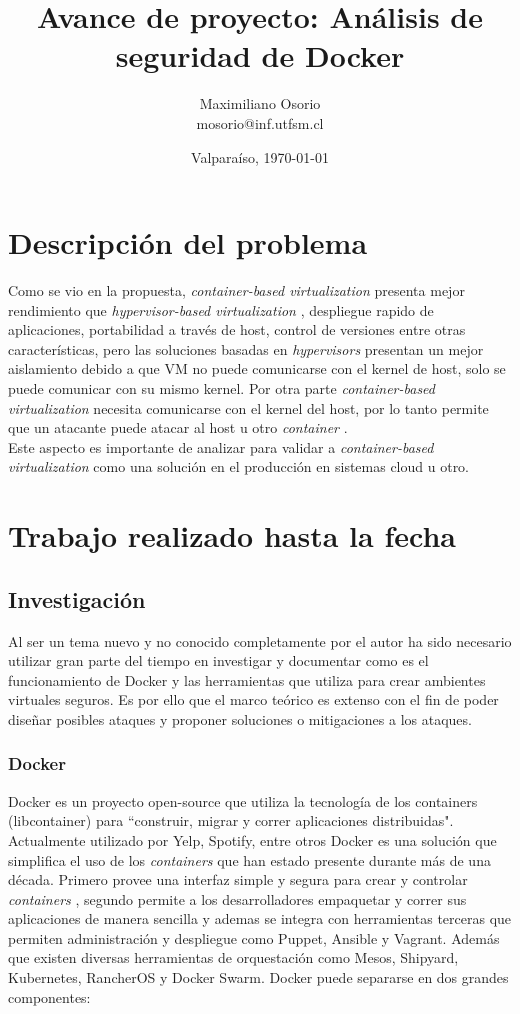 \documentclass[letter,10pt]{article}
\title{Avance de proyecto: Análisis de seguridad de Docker}
\author{Maximiliano Osorio \\ mosorio@inf.utfsm.cl}
\date{Valparaíso, \today}
\begin{document}
\maketitle

\newcommand{\container}{\textit{container }}
\newcommand{\containers}{\textit{containers }}

\section{Descripción del problema}
Como se vio en la propuesta, \textit{container-based virtualization} presenta mejor rendimiento que \textit{hypervisor-based virtualization} \cite{padala2007performance}, despliegue rapido de aplicaciones, portabilidad a través de host, control de versiones entre otras características\cite{Redhat:2015:Online}, pero las soluciones basadas en \textit{hypervisors} presentan un mejor aislamiento debido a que VM no puede comunicarse con el kernel de host, solo se puede comunicar con su mismo kernel. Por otra parte  \textit{container-based virtualization} necesita comunicarse con el kernel del host, por lo tanto permite que un atacante puede atacar al host u otro \container.\\ Este aspecto es importante de analizar para validar a \textit{container-based virtualization} como una solución en el producción en sistemas cloud u otro. 


\section{Trabajo realizado hasta la fecha}
\subsection{Investigación}
Al ser un tema nuevo y no conocido completamente por el autor ha sido necesario utilizar gran parte del tiempo en investigar y documentar como es el funcionamiento de Docker y las herramientas que utiliza para crear ambientes virtuales seguros. Es por ello que el marco teórico es extenso con el fin de poder diseñar posibles ataques y proponer soluciones o mitigaciones  a los ataques.
\subsubsection{Docker}
Docker es un proyecto open-source que utiliza la tecnología de los containers (libcontainer) para ``construir, migrar y correr aplicaciones distribuidas". Actualmente utilizado por Yelp, Spotify, entre otros \cite{Docker:2015:Online} \cite{marmolnetworking}
Docker es una solución que simplifica el uso de los \containers que han estado presente durante más de una década. Primero provee una interfaz simple y segura para crear y controlar \textit{containers} \cite{bui2015analysis}, segundo permite a los desarrolladores empaquetar y correr sus aplicaciones de manera sencilla y ademas se integra con herramientas terceras que permiten administración y despliegue como Puppet, Ansible y Vagrant. Además que existen diversas herramientas de orquestación como Mesos, Shipyard, Kubernetes, RancherOS y Docker Swarm. %
  Docker puede separarse en dos grandes componentes: 
  
\end{document}
